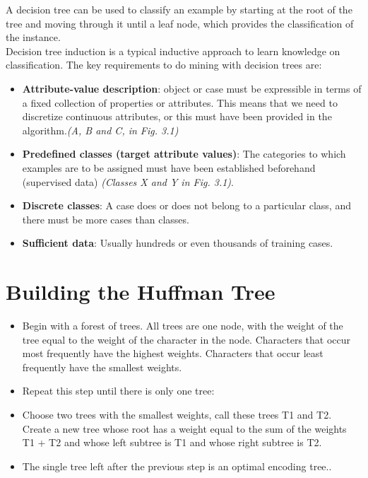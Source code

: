 \documentclass[12pt]{report}
\begin{document}
A decision tree can be used to classify an example by starting at the root of the tree and moving through it until a leaf node, which provides the classification of the instance.\\

Decision tree induction is a typical inductive approach to learn knowledge on classification. The key requirements to do mining with decision trees are:
\begin{itemize}
\item{\textbf{Attribute-value description}: object or case must be expressible in terms of a fixed collection of properties or attributes. This means that we need to discretize continuous attributes, or this must have been provided in the algorithm.\textit{(A, B and C, in Fig. 3.1)}}
\item{\textbf{Predefined classes (target attribute values)}: The categories to which examples are to be assigned must have been established beforehand (supervised data) \textit{(Classes X and Y in Fig. 3.1)}.}
\item{\textbf{Discrete classes}: A case does or does not belong to a particular class, and there must be more cases than classes.}
\item{\textbf{Sufficient data}: Usually hundreds or even thousands of training cases.}

\end{itemize}



\section{Building the Huffman Tree}

\begin{itemize}

\item Begin with a forest of trees. All trees are one node, with the weight of the tree equal to the weight of the character in the node. Characters that occur most frequently have the highest weights. Characters that occur least frequently have the smallest weights.
\item    Repeat this step until there is only one tree:
\item    Choose two trees with the smallest weights, call these trees T1 and T2. Create a new tree whose root has a weight equal to the sum of the weights T1 + T2 and whose left subtree is T1 and whose right subtree is T2.
\item    The single tree left after the previous step is an optimal encoding tree..

\end{itemize}
\end{document}

